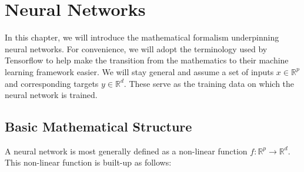 \section{Neural Networks}\label{sec:neural_networks}
In this chapter, we will introduce the mathematical formalism underpinning
neural networks. For convenience, we will adopt the terminology used by Tensorflow\cite{tf} 
to help make the transition from the mathematics to their machine learning framework easier.
We will stay general and assume a set of inputs $x \in \mathbb{R}^p$ and corresponding targets $y \in \mathbb{R}^d$. 
These serve as the training data on which the neural network is trained.

\subsection{Basic Mathematical Structure}
A neural network is most generally defined as a non-linear function $f : \mathbb{R}^p \to \mathbb{R}^d$.
This non-linear function is built-up as follows:

